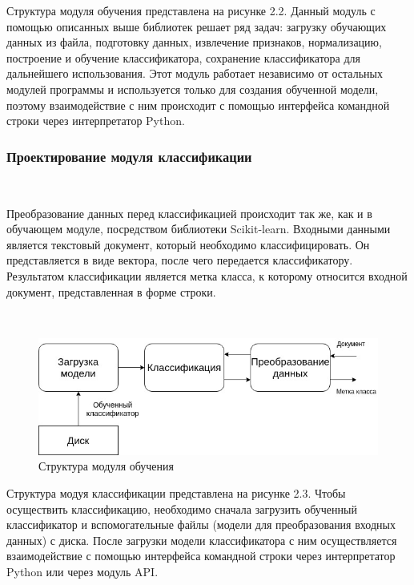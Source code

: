 Структура модуля обучения представлена на рисунке 2.2. Данный модуль с помощью описанных выше библиотек решает ряд задач: загрузку обучающих данных из файла, подготовку данных, извлечение признаков, нормализацию, построение и обучение классификатора, сохранение классификатора для дальнейшего использования. Этот модуль работает независимо от остальных модулей программы и используется только для создания обученной модели, поэтому взаимодействие с ним происходит с помощью интерфейса командной строки через интерпретатор Python. 

\newpage
\subsubsection{Проектирование модуля классификации}
\

Преобразование данных перед классификацией происходит так же, как и в обучающем модуле, посредством библиотеки Scikit-learn. Входными данными является текстовый документ, который необходимо классифицировать. Он представляется в виде вектора, после чего передается классификатору. Результатом классификации является метка класса, к которому относится входной документ, представленная в форме строки.

\

  \begin{figure}[h!]
    \centering
    \setlength{\fboxsep}{5pt}
    \includegraphics[width=.99\textwidth]{img/classification-module}
    \vspace*{6pt}
    \caption{Структура модуля обучения}\label{fig:project-tree}
  \end{figure}


Структура модуя классификации представлена на рисунке 2.3. Чтобы осуществить классификацию, необходимо сначала загрузить обученный классификатор и вспомогательные файлы (модели для преобразования входных данных) с диска. После загрузки модели классификатора с ним осуществляется взаимодействие с помощью интерфейса командной строки через интерпретатор Python или через модуль API.

